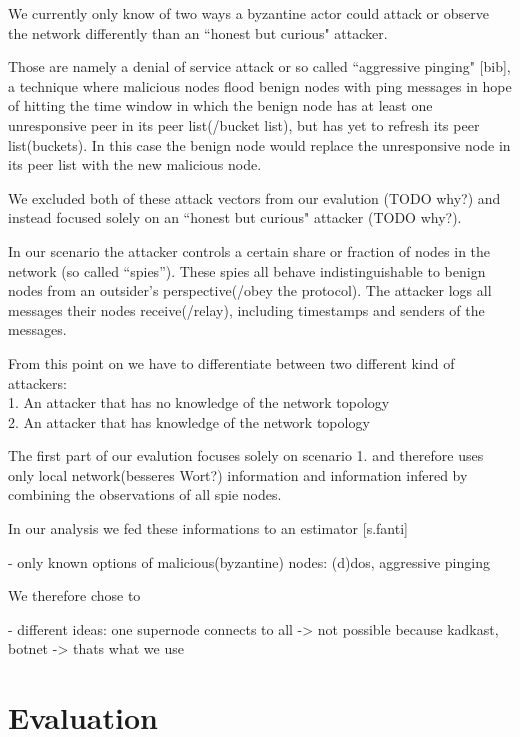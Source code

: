 We currently only know of two ways a byzantine actor could attack or observe the network differently than
an ``honest but curious" attacker.

Those are namely a denial of service attack or so called ``aggressive pinging" [bib], a technique where malicious nodes flood
benign nodes with ping messages in hope of hitting the time window in which the benign node has at least one unresponsive
peer in its peer list(/bucket list), but has yet to refresh its peer list(buckets). In this case
the benign node would replace the unresponsive node in its peer list with the new malicious node.


We excluded both of these attack vectors from our evalution (TODO why?) and instead focused solely on an ``honest but curious" attacker (TODO why?).

In our scenario the attacker controls a certain share or fraction of nodes in the network (so called ``spies'').
These spies all behave indistinguishable to benign nodes from an outsider's perspective(/obey the protocol).
The attacker logs all messages their nodes receive(/relay), including timestamps and senders of the messages.

From this point on we have to differentiate between two different kind of attackers: \\
1. An attacker that has no knowledge of the network topology \\
2. An attacker that has knowledge of the network topology

The first part of our evalution focuses solely on scenario 1. and therefore uses only local
network(besseres Wort?) information and information infered by combining the observations of all spie nodes.


In our analysis we fed these informations to an estimator [s.fanti]

- only known options of malicious(byzantine) nodes: (d)dos, aggressive pinging

We therefore chose to 

- different ideas: one supernode connects to all -> not possible because kadkast, botnet -> thats what we use

\section{Evaluation}